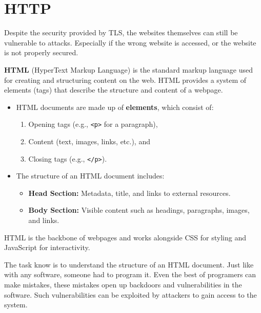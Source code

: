 \section{HTTP}
Despite the security provided by TLS, the websites themselves can still be vulnerable to attacks.
Especially if the wrong website is accessed, or the website is not properly secured.

\begin{Def}

    \label{def:html}
    \textbf{HTML} (HyperText Markup Language) is the standard markup language used for creating and structuring content on the web. HTML provides a system of elements (tags) that describe the structure and content of a webpage.
    
    \begin{itemize}
        \item HTML documents are made up of \textbf{elements}, which consist of:
        \begin{enumerate}
            \item Opening tags (e.g., \texttt{<p>} for a paragraph),
            \item Content (text, images, links, etc.), and
            \item Closing tags (e.g., \texttt{</p>}).
        \end{enumerate}
        \item The structure of an HTML document includes:
        \begin{itemize}
            \item \textbf{Head Section:} Metadata, title, and links to external resources.
            \item \textbf{Body Section:} Visible content such as headings, paragraphs, images, and links.
        \end{itemize}
    \end{itemize}
    
    \noindent HTML is the backbone of webpages and works alongside CSS for styling and JavaScript for interactivity.
    \end{Def}

    \noindent
    The task know is to understand the structure of an HTML document. Just like with any software, someone had to program it.
    Even the best of programers can make mistakes, these mistakes open up backdoors and vulnerabilities in the software. 
    Such vulnerabilities can be exploited by attackers to gain access to the system.

